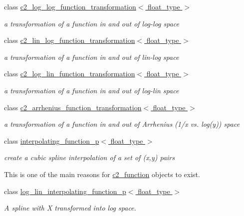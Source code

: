 \begin{DoxyCompactItemize}
class \hyperlink{classc2__log__log__function__transformation}{c2\-\_\-log\-\_\-log\-\_\-function\-\_\-transformation$<$ float\-\_\-type $>$}
\begin{DoxyCompactList}\small\item\em a transformation of a function in and out of log-\/log space \end{DoxyCompactList}\item 
class \hyperlink{classc2__lin__log__function__transformation}{c2\-\_\-lin\-\_\-log\-\_\-function\-\_\-transformation$<$ float\-\_\-type $>$}
\begin{DoxyCompactList}\small\item\em a transformation of a function in and out of lin-\/log space \end{DoxyCompactList}\item 
class \hyperlink{classc2__log__lin__function__transformation}{c2\-\_\-log\-\_\-lin\-\_\-function\-\_\-transformation$<$ float\-\_\-type $>$}
\begin{DoxyCompactList}\small\item\em a transformation of a function in and out of log-\/lin space \end{DoxyCompactList}\item 
class \hyperlink{classc2__arrhenius__function__transformation}{c2\-\_\-arrhenius\-\_\-function\-\_\-transformation$<$ float\-\_\-type $>$}
\begin{DoxyCompactList}\small\item\em a transformation of a function in and out of Arrhenius (1/x vs. log(y)) space \end{DoxyCompactList}\item 
class \hyperlink{classinterpolating__function__p}{interpolating\-\_\-function\-\_\-p$<$ float\-\_\-type $>$}
\begin{DoxyCompactList}\small\item\em create a cubic spline interpolation of a set of (x,y) pairs

This is one of the main reasons for \hyperlink{classc2__function}{c2\-\_\-function} objects to exist. \end{DoxyCompactList}\item 
class \hyperlink{classlog__lin__interpolating__function__p}{log\-\_\-lin\-\_\-interpolating\-\_\-function\-\_\-p$<$ float\-\_\-type $>$}
\begin{DoxyCompactList}\small\item\em A spline with X transformed into log space.


\end{DoxyCompactList}
\end{DoxyCompactItemize}
